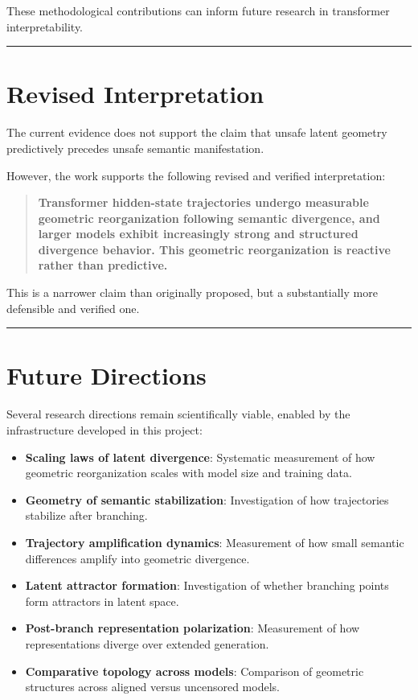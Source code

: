 \documentclass[12pt,a4paper]{article}
\begin{document}
These methodological contributions can inform future research in transformer interpretability.

\medskip
\hrule
\medskip

\section{Revised Interpretation}

The current evidence does not support the claim that unsafe latent geometry predictively precedes unsafe semantic manifestation.

However, the work supports the following revised and verified interpretation:

\begin{quote}
\textbf{Transformer hidden-state trajectories undergo measurable geometric reorganization following semantic divergence, and larger models exhibit increasingly strong and structured divergence behavior. This geometric reorganization is reactive rather than predictive.}
\end{quote}

This is a narrower claim than originally proposed, but a substantially more defensible and verified one.

\medskip
\hrule
\medskip

\section{Future Directions}

Several research directions remain scientifically viable, enabled by the infrastructure developed in this project:

\begin{itemize}
    \item \textbf{Scaling laws of latent divergence}: Systematic measurement of how geometric reorganization scales with model size and training data.
    \item \textbf{Geometry of semantic stabilization}: Investigation of how trajectories stabilize after branching.
    \item \textbf{Trajectory amplification dynamics}: Measurement of how small semantic differences amplify into geometric divergence.
    \item \textbf{Latent attractor formation}: Investigation of whether branching points form attractors in latent space.
    \item \textbf{Post-branch representation polarization}: Measurement of how representations diverge over extended generation.
    \item \textbf{Comparative topology across models}: Comparison of geometric structures across aligned versus uncensored models.
\end{itemize}
\end{document}
